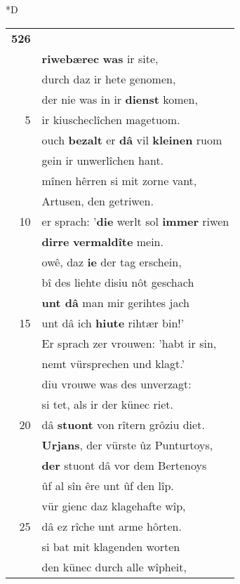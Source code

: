 \documentclass[8pt,a4paper,notitlepage]{article}
\begin{document}
\begin{table}[ht]
\begin{minipage}[t]{0.5\linewidth}
\small
\begin{center}*D
\end{center}
\begin{tabular}{rl}
\textbf{526} & \textbf{\begin{large}D\end{large}iu juncvrouwe reit} uns mite.\\ 
 & \textbf{riwebærec} \textbf{was} ir site,\\ 
 & durch daz ir hete genomen,\\ 
 & der nie was in ir \textbf{dienst} komen,\\ 
5 & ir kiuscheclîchen magetuom.\\ 
 & ouch \textbf{bezalt} er \textbf{dâ} vil \textbf{kleinen} ruom\\ 
 & gein ir unwerlîchen hant.\\ 
 & mînen hêrren si mit zorne vant,\\ 
 & Artusen, den getriwen.\\ 
10 & er sprach: '\textbf{die} werlt sol \textbf{immer} riwen\\ 
 & \textbf{dirre} \textbf{vermaldîte} mein.\\ 
 & owê, daz \textbf{ie} der tag erschein,\\ 
 & bî des liehte disiu nôt geschach\\ 
 & \textbf{unt dâ} man mir gerihtes jach\\ 
15 & unt dâ ich \textbf{hiute} rihtær bin!'\\ 
 & Er sprach zer vrouwen: 'habt ir sin,\\ 
 & nemt vürsprechen und klagt.'\\ 
 & diu vrouwe was des unverzagt:\\ 
 & si tet, als ir der künec riet.\\ 
20 & dâ \textbf{stuont} von rîtern grôziu diet.\\ 
 & \textbf{Urjans}, der vürste ûz Punturtoys,\\ 
 & \textbf{der} stuont dâ vor dem Bertenoys\\ 
 & ûf al sîn êre unt ûf den lîp.\\ 
 & vür gienc daz klagehafte wîp,\\ 
25 & dâ ez rîche unt arme hôrten.\\ 
 & si bat mit klagenden worten\\ 
 & den künec durch alle wîpheit,\\ 

\end{tabular}
\end{minipage}
\end{table}
\end{document}
